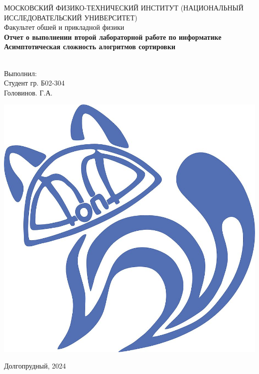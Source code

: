 \begin{titlepage}
	\begin{center}
		МОСКОВСКИЙ ФИЗИКО-ТЕХНИЧЕСКИЙ ИНСТИТУТ (НАЦИОНАЛЬНЫЙ ИССЛЕДОВАТЕЛЬСКИЙ УНИВЕРСИТЕТ) \\
		
		
		\hfill \break
		Факультет обшей и прикладной физики\\
		\vspace{2.5cm}
		\LARGE{\textbf{Отчет о выполнении второй лабораторной работе по информатике \\Асимптотическая сложность алогритмов сортировки}}\\
		\hfill \break
		\\
	\end{center}
	
	\begin{flushright}
		Выполнил:\\
		Студент гр. Б02-304\\
		Головинов. Г.А.
	\end{flushright}
	
	\vfill
	
	\begin{center}
		\includegraphics[width=0.15\linewidth]{uni}
	\end{center}
	
	\begin{center} Долгопрудный, 2024 \end{center}
	
	\thispagestyle{empty}
	
\end{titlepage}